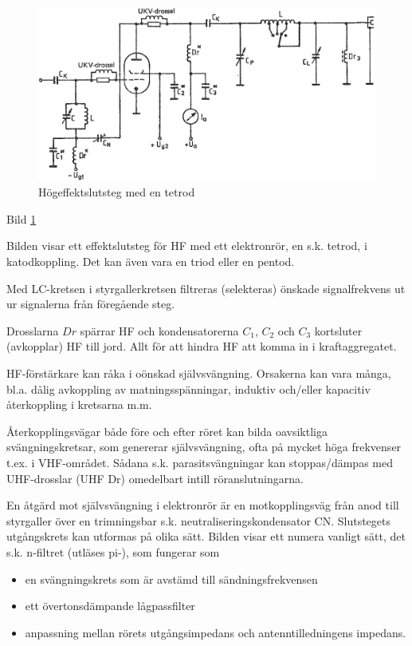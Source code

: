 \begin{figure}
\includegraphics[width=\textwidth]{images/cropped_pdfs/bild_2_3-50.pdf}
\caption{Högeffektslutsteg med en tetrod}
\label{fig:BildII3-50}
\end{figure}

Bild \ref{fig:BildII3-50}

Bilden visar ett effektslutsteg för HF med ett elektronrör, en
s.k. tetrod, i katodkoppling. Det kan även vara en triod eller en
pentod.

Med LC-kretsen i styrgallerkretsen filtreras (selekteras) önskade
signalfrekvens ut ur signalerna från föregående steg.

Drosslarna \(Dr\) spärrar HF och kondensatorerna \(C_1\), \(C_2\) och
\(C_3\) kortsluter (avkopplar) HF till jord. Allt för att hindra HF
att komma in i kraftaggregatet.

HF-förstärkare kan råka i oönskad självsvängning. Orsakerna kan vara
många, bl.a. dålig avkoppling av matningsspänningar, induktiv
och/eller kapacitiv återkoppling i kretsarna m.m.

Återkopplingsvägar både före och efter röret kan bilda oavsiktliga
svängningskretsar, som genererar självsvängning, ofta på mycket höga
frekvenser t.ex. i VHF-området. Sådana s.k. parasitsvängningar kan
stoppas/dämpas med UHF-drosslar (UHF Dr) omedelbart intill
röranslutningarna.

En åtgärd mot självsvängning i elektronrör är en motkopplingsväg från
anod till styrgaller över en trimningsbar
s.k. neutraliseringskondensator CN. Slutstegets utgångskrets kan
utformas på olika sätt. Bilden visar ett numera vanligt sätt, det
s.k. n-filtret (utläses pi-), som fungerar som
\begin{itemize}
  \item en svängningskrets som är avstämd till sändningsfrekvensen
  \item ett övertonsdämpande lågpassfilter
  \item anpassning mellan rörets utgångsimpedans och antenntilledningens impedans.
\end{itemize}

